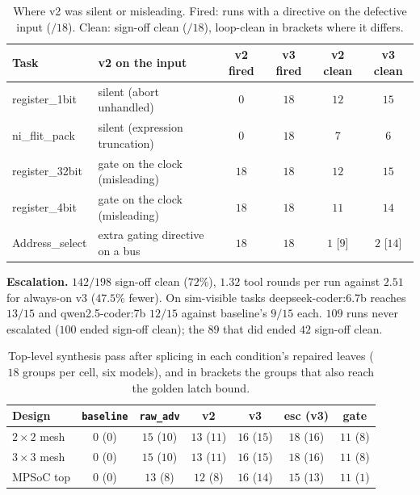 \documentclass[11pt]{article}
\newcommand{\cond}[1]{\texttt{#1}}
\begin{document}
\begin{table}[htbp]
\centering
\caption{Where v2 was silent or misleading. Fired: runs with a directive on the
defective input ($/18$). Clean: sign-off clean ($/18$), loop-clean in brackets
where it differs.}
\label{tab:s-p3-upgrade}
\small
\begin{tabular}{@{}l l c c c c@{}}
\toprule
\textbf{Task} & \textbf{v2 on the input} & \textbf{v2 fired} & \textbf{v3 fired} & \textbf{v2 clean} & \textbf{v3 clean} \\
\midrule
register\_1bit  & silent (abort unhandled)        & $0$  & $18$ & $12$ & $15$ \\
ni\_flit\_pack  & silent (expression truncation)  & $0$  & $18$ & $7$  & $6$ \\
register\_32bit & gate on the clock (misleading)  & $18$ & $18$ & $12$ & $15$ \\
register\_4bit  & gate on the clock (misleading)  & $18$ & $18$ & $11$ & $14$ \\
Address\_select & extra gating directive on a bus & $18$ & $18$ & $1$ [$9$] & $2$ [$14$] \\
\bottomrule
\end{tabular}
\end{table}

\textbf{Escalation.} $142/198$ sign-off clean ($72\%$), $1.32$ tool rounds per
run against $2.51$ for always-on v3 ($47.5\%$ fewer). On sim-visible tasks
deepseek-coder:6.7b reaches $13/15$ and qwen2.5-coder:7b $12/15$ against
baseline's $9/15$ each. $109$ runs never escalated ($100$ ended sign-off clean);
the $89$ that did ended $42$ sign-off clean.

\begin{table}[htbp]
\centering
\caption{Top-level synthesis pass after splicing in each condition's repaired
leaves ($18$ groups per cell, six models), and in brackets the groups that also
reach the golden latch bound.}
\label{tab:s-p3-compose}
\small
\begin{tabular}{@{}l c c c c c c@{}}
\toprule
\textbf{Design} & \cond{baseline} & \cond{raw\_adv} & \textbf{v2} & \textbf{v3} & \textbf{esc (v3)} & \textbf{gate} \\
\midrule
$2{\times}2$ mesh & $0$ ($0$) & $15$ ($10$) & $13$ ($11$) & $16$ ($15$) & $18$ ($16$) & $11$ ($8$) \\
$3{\times}3$ mesh & $0$ ($0$) & $15$ ($10$) & $13$ ($11$) & $16$ ($15$) & $18$ ($16$) & $11$ ($8$) \\
MPSoC top         & $0$ ($0$) & $13$ ($8$)  & $12$ ($8$)  & $16$ ($14$) & $15$ ($13$) & $11$ ($1$) \\
\bottomrule
\end{tabular}
\end{table}
\end{document}
